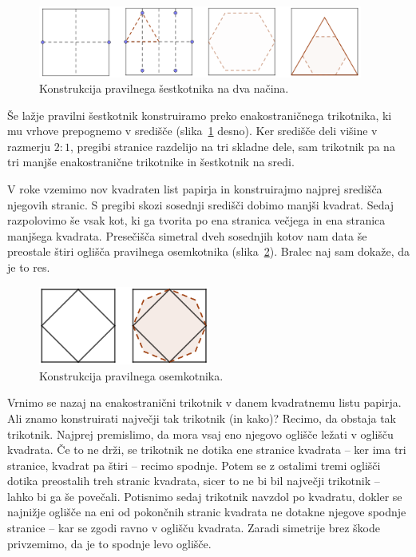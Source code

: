 \begin{figure}[h]
    \centering
    \includegraphics[width=0.95\textwidth]{images/n-kotniki/6kotnik_basic.png}
    \caption[Konstrukcija pravilnega šestkotnika (način $1$) in $2$]{Konstrukcija pravilnega šestkotnika na dva načina.}
    \label{fig:6kotnik_basic}
\end{figure}

Še lažje pravilni šestkotnik konstruiramo preko enakostraničnega trikotnika, ki mu vrhove prepognemo v središče (slika~\ref{fig:6kotnik_basic} desno). Ker središče deli višine v razmerju $2:1$, pregibi stranice razdelijo na tri skladne dele, sam trikotnik pa na tri manjše enakostranične trikotnike in šestkotnik na sredi.

V roke vzemimo nov kvadraten list papirja in konstruirajmo najprej središča njegovih stranic. S pregibi skozi sosednji središči dobimo manjši kvadrat. Sedaj razpolovimo še vsak kot, ki ga tvorita po ena stranica večjega in ena stranica manjšega kvadrata. Presečišča simetral dveh sosednjih kotov nam data še preostale štiri oglišča pravilnega osemkotnika (slika~\ref{fig:8kotnik_basic}). Bralec naj sam dokaže, da je to res.

\begin{figure}[h]
    \centering
    \includegraphics[width=0.5\textwidth]{images/n-kotniki/8kotnik_basic.png}
    \caption[Konstrukcija pravilnega osemkotnika]{Konstrukcija pravilnega osemkotnika.}
    \label{fig:8kotnik_basic}
\end{figure}

Vrnimo se nazaj na enakostranični trikotnik v danem kvadratnemu listu papirja. Ali znamo konstruirati največji tak trikotnik (in kako)? Recimo, da obstaja tak trikotnik. Najprej premislimo, da mora vsaj eno njegovo oglišče ležati v oglišču kvadrata. Če to ne drži, se trikotnik ne dotika ene stranice kvadrata -- ker ima tri stranice, kvadrat pa štiri -- recimo spodnje. Potem se z ostalimi tremi oglišči dotika preostalih treh stranic kvadrata, sicer to ne bi bil največji trikotnik -- lahko bi ga še povečali. Potisnimo sedaj trikotnik navzdol po kvadratu, dokler se najnižje oglišče na eni od pokončnih stranic kvadrata ne dotakne njegove spodnje stranice -- kar se zgodi ravno v oglišču kvadrata. Zaradi simetrije brez škode privzemimo, da je to spodnje levo oglišče.

